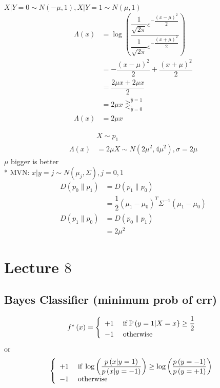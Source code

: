 \documentclass{article}
\begin{document}
\begin{eg} \label{eg:normlam} 
$X  | Y = 0 \sim  N\left(-\mu, 1\right), X  | Y = 1 \sim  N\left(\mu, 1\right)$
\begin{align*}
\Lambda\left(x\right) &= \log\left(\dfrac{\dfrac{1}{\sqrt{2 \pi}} e^{- \dfrac{\left(x - \mu\right)^{2}}{2}}}{\dfrac{1}{\sqrt{2 \pi}} e^{- \dfrac{\left(x + \mu\right)^{2}}{2}}}\right)
\\ &= - \dfrac{\left(x - \mu\right)^{2}}{2} +  \dfrac{\left(x + \mu\right)^{2}}{2}
\\ &= \dfrac{2 \mu x + 2 \mu x}{2}
\\ &= 2 \mu x \gtreqless^{\hat{y} = 1}_{\hat{y} = 0}
\\ \Lambda\left(x\right) &= 2 \mu x 
\end{align*}\end{eg}
\begin{align*}
&X  \sim  p_{1}
\\ \Lambda\left(x\right) &= 2 \mu X \sim  N\left(2 \mu^{2}, 4 \mu^{2}\right), \sigma = 2 \mu
\end{align*}
$\mu$ bigger is better
\\* MVN: $x  | y = j \sim  N\left(\mu_{j}, \Sigma\right), j = 0, 1$
\begin{align*}
D\left(p_{0} \| p_{1}\right)  &= D\left(p_{1} \| p_{0}\right) 
\\ &= \dfrac{1}{2} \left(\mu_{1} - \mu_{0}\right)^{T} \Sigma^{-1} \left(\mu_{1} - \mu_{0}\right)
\\ D\left(p_{1} \| p_{0}\right)  &= D\left(p_{0} \| p_{1}\right) 
\\ &= 2 \mu^{2}
\end{align*}





\section{Lecture $8$} 


\subsection{Bayes Classifier (minimum prob of err)}
\[ f^\star \left(x\right) =\left\{ \begin{array}{ll}
+1& \text{\;if\;} \mathbb{P}\left(y = 1 | X = x\right\} \geq  \dfrac{1}{2} \\
-1& \text{\;otherwise\;} \\
\end{array}\right. \]
or
\[ \left\{ \begin{array}{ll}
+1& \text{\;if\;} \log \left(\dfrac{p\left(x | y = 1\right)}{p\left(x | y = -1\right)}\right) \geq  \log \left(\dfrac{p\left(y = -1\right)}{p\left(y = +1\right)}\right) \\
-1& \text{\;otherwise\;} \\
\end{array}\right. \]
\end{document}
